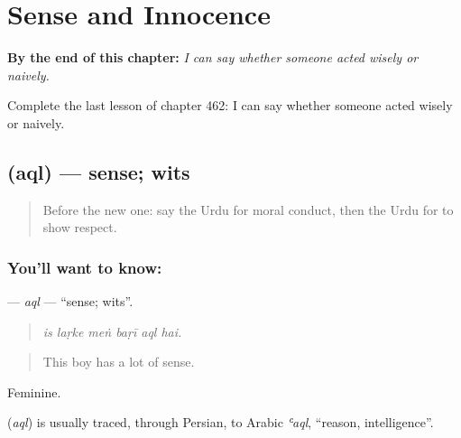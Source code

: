 
\chapter{Sense and Innocence}
\label{ch:ur-sense-and-innocence}

\begin{chapteropening}
\textbf{By the end of this chapter:} \emph{I can say whether someone acted wisely or naively.}

Complete the last lesson of chapter 462: I can say whether someone acted wisely or naively.
\end{chapteropening}

\section[\texorpdfstring{\ur{عقل} (aql)}{عقل (aql)}]{ (aql) — sense; wits}

\label{lesson:UR-C462-aql}



\begin{quote}
Before the new one: say the Urdu for moral conduct, then the Urdu for to show respect.
\end{quote}

\subsection*{You'll want to know: }
\textbf{} — \emph{aql} — \textquotedblleft{}sense; wits\textquotedblright{}.

\begin{quote}
     
\end{quote}

\begin{quote}
\emph{is laṛke meṅ baṛī aql hai.}
\end{quote}

\begin{quote}
This boy has a lot of sense.
\end{quote}

Feminine.

\begin{cousinweb}
\textbf{} (\emph{aql}) is usually traced, through Persian, to Arabic \emph{ʿaql}, \textquotedblleft{}reason, intelligence\textquotedblright{}.
\end{cousinweb}

